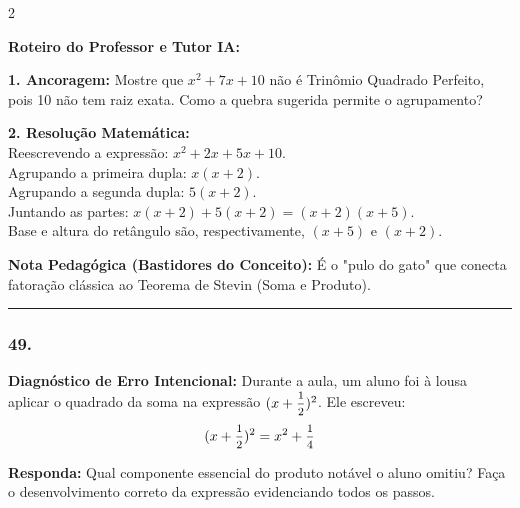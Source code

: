 \begin{multicols*}{2}
\ifgabarito
    \begin{tcolorbox}[colback=CorTitUm!5, colframe=CorTitUm, boxrule=1pt, arc=4pt, left=6pt, right=6pt, top=6pt, bottom=6pt]
    \small\textbf{\textcolor{CorTitUm}{Roteiro do Professor e Tutor IA:}}\par\vspace{0.1cm}
    \color{CinzaEscuro}
    \textbf{1. Ancoragem:} Mostre que $x^2 + 7x + 10$ não é Trinômio Quadrado Perfeito, pois 10 não tem raiz exata. Como a quebra sugerida permite o agrupamento?\par\vspace{0.1cm}
    \textbf{2. Resolução Matemática:}\\
    Reescrevendo a expressão: $x^2 + 2x + 5x + 10$.\\
    Agrupando a primeira dupla: $x(x + 2)$.\\
    Agrupando a segunda dupla: $5(x + 2)$.\\
    Juntando as partes: $x(x + 2) + 5(x + 2) = (x + 2)(x + 5)$.\\
    Base e altura do retângulo são, respectivamente, $(x + 5)$ e $(x + 2)$.
    \end{tcolorbox}
    \vspace{0.15cm}
    
    \begin{boxexplicacao}
    \textbf{Nota Pedagógica (Bastidores do Conceito):} É o "pulo do gato" que conecta fatoração clássica ao Teorema de Stevin (Soma e Produto).
    \end{boxexplicacao}
\fi

\par\vspace{\espacoQuestao}

\noindent\textcolor{CorLinha}{\rule{\linewidth}{0.5pt}} 
\par\vspace{\espacoPreQuestao}
\subsubsection*{49.} 
\begin{enunciadoLiteral}
\textbf{Diagnóstico de Erro Intencional:} Durante a aula, um aluno foi à lousa aplicar o quadrado da soma na expressão $(x + \mfrac{1}{2})^2$. Ele escreveu:
$$(x + \mfrac{1}{2})^2 = x^2 + \mfrac{1}{4}$$

\begin{boxresponda}
\textbf{Responda:} Qual componente essencial do produto notável o aluno omitiu? Faça o desenvolvimento correto da expressão evidenciando todos os passos.
\end{boxresponda}
\end{enunciadoLiteral}


\end{multicols*}
